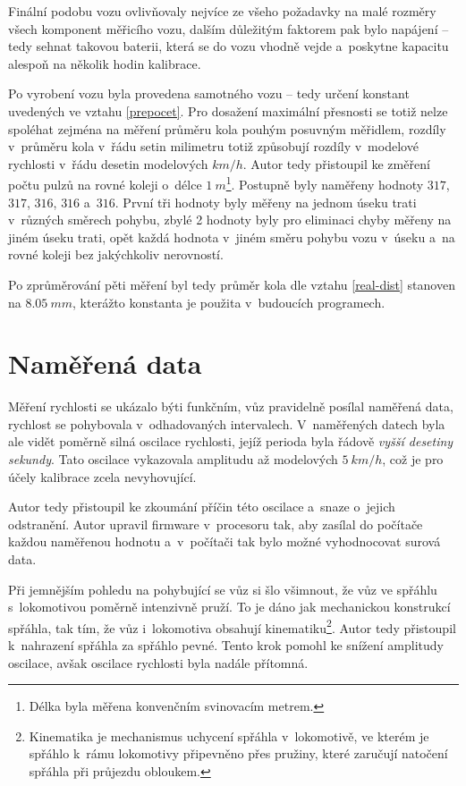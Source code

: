 Finální podobu vozu ovlivňovaly nejvíce ze všeho požadavky na malé rozměry všech
komponent měřicího vozu, dalším důležitým faktorem pak bylo napájení -- tedy
sehnat takovou baterii, která se do vozu vhodně vejde a~poskytne kapacitu
alespoň na několik hodin kalibrace.

Po vyrobení vozu byla provedena  samotného vozu -- tedy určení
konstant uvedených ve vztahu \ref{prepocet}. Pro dosažení maximální přesnosti
se totiž nelze spoléhat zejména na měření průměru kola pouhým posuvným
měřidlem, rozdíly v~průměru kola v~řádu setin milimetru totiž způsobují rozdíly
v~modelové rychlosti v~řádu desetin modelových $km/h$. Autor tedy přistoupil ke
změření počtu pulzů na rovné koleji o~délce $1\ m$\footnote{Délka byla měřena
konvenčním svinovacím metrem.}. Postupně byly naměřeny hodnoty $317$, $317$,
$316$, $316$ a~$316$. První tři hodnoty byly měřeny na jednom úseku trati
v~různých směrech pohybu, zbylé 2 hodnoty byly pro eliminaci chyby měřeny na
jiném úseku trati, opět každá hodnota v~jiném směru pohybu vozu v~úseku a~na
rovné koleji bez jakýchkoliv nerovností.

Po zprůměrování pěti měření byl tedy průměr kola dle vztahu \ref{real-dist}
stanoven na $8.05\ mm$, kterážto konstanta je použita v~budoucích programech.

\section{Naměřená data}
\label{sec:wsm-data}

Měření rychlosti se ukázalo býti funkčním, vůz pravidelně posílal naměřená
data, rychlost se pohybovala v~odhadovaných intervalech. V~naměřených datech
byla ale vidět poměrně silná oscilace rychlosti, jejíž perioda byla řádově
\textit{vyšší desetiny sekundy}. Tato oscilace vykazovala amplitudu až
modelových $5\ km/h$, což je pro účely kalibrace zcela nevyhovující.

Autor tedy přistoupil ke zkoumání příčin této oscilace a~snaze o~jejich
odstranění. Autor upravil firmware v~procesoru tak, aby zasílal do počítače
každou naměřenou hodnotu a~v~počítači tak bylo možné vyhodnocovat surová data.

Při jemnějším pohledu na pohybující se vůz si šlo všimnout, že vůz ve spřáhlu
s~lokomotivou poměrně intenzivně pruží. To je dáno jak mechanickou konstrukcí
spřáhla, tak tím, že vůz i~lokomotiva obsahují kinematiku\footnote{Kinematika
je mechanismus uchycení spřáhla v~lokomotivě, ve kterém je spřáhlo k~rámu
lokomotivy připevněno přes pružiny, které zaručují natočení spřáhla při
průjezdu obloukem.}.
Autor tedy přistoupil k~nahrazení spřáhla za spřáhlo pevné. Tento krok pomohl
ke snížení amplitudy oscilace, avšak oscilace rychlosti byla nadále přítomná.

